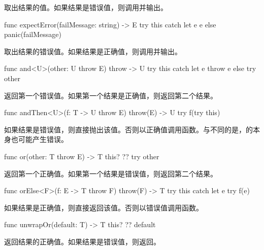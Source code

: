 \pnum
{}取出结果的值。如果结果是错误值，则调用并输出。

\begin{itemdecl}
func expectError(failMessage: string) -> E {
    try this catch let e { e } else { panic(failMessage) }
}
\end{itemdecl}

\pnum
{}取出结果的错误值。如果结果是正确值，则调用并输出。

\begin{itemdecl}
func and<U>(other: U throw E) throw -> U {
    try this catch let e { throw e } else { try other }
}
\end{itemdecl}

\pnum
{}返回第一个错误值。如果第一个结果是正确值，则返回第二个结果。

\begin{itemdecl}
func andThen<U>(f: T -> U throw E) throw(E) -> U {
    try f(try this)
}
\end{itemdecl}

\pnum
如果结果是错误值，则直接抛出该值。否则以正确值调用函数。\enternote 与不同的是，的本身也可能产生错误。\exitnote

\begin{itemdecl}
func or(other: T throw E) -> T {
    this? ?? try other
}
\end{itemdecl}

\pnum
{}返回第一个正确值。如果第一个结果是错误值，则返回第二个结果。

\begin{itemdecl}
func orElse<F>(f: E -> T throw F) throw(F) -> T {
    try this catch let e { try f(e) }
}
\end{itemdecl}

\pnum
如果结果是正确值，则直接返回该值。否则以错误值调用函数。

\begin{itemdecl}
func unwrapOr(default: T) -> T {
    this? ?? default
}
\end{itemdecl}

\pnum
{}返回结果的正确值。如果结果是错误值，则返回。

